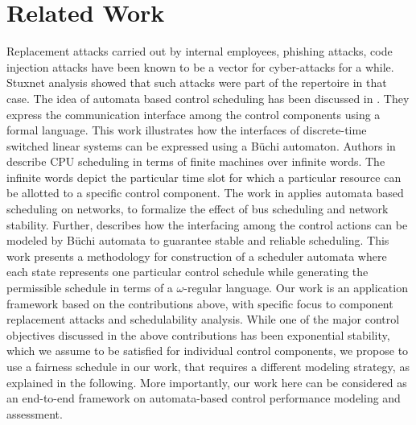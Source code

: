 \section{Related Work} \label{sec2}
Replacement attacks \cite{GhoshHD12} carried out by internal employees, phishing attacks, code injection attacks have been known to be a vector for cyber-attacks for a while. Stuxnet analysis showed that such
attacks were part of the repertoire in that case. 
The idea of automata based control scheduling has been discussed in \cite{WeissA07}. They express
the communication interface among the control components using a formal language. This work illustrates how the interfaces of discrete-time switched linear systems
can be expressed using a B\"{u}chi automaton. Authors in \cite{AlurW08}  describe CPU scheduling
in terms of finite machines over infinite words. The infinite words depict the particular time 
slot for which a particular resource can be allotted to a specific control component. The work in \cite{WeissFAA09} applies automata based scheduling on networks, to formalize the effect of bus scheduling and network stability. Further, \cite{GhoshMDHD16} describes how the interfacing among 
the control actions can be modeled by B\"{u}chi automata to guarantee stable and reliable
scheduling. This work presents a methodology for construction of a scheduler automata 
where each state represents one particular control schedule while generating the permissible 
schedule in terms of a $\omega$-regular language. Our work is an application framework based on the contributions above, with specific focus to component replacement attacks and schedulability analysis. While one of the major control objectives discussed in the above contributions has been exponential stability, which we assume to be satisfied for individual control components, we propose to use a fairness schedule in our work, that requires a different modeling strategy, as explained in the following. More importantly, our work here can be considered as an end-to-end framework on automata-based control performance modeling and assessment. \\
